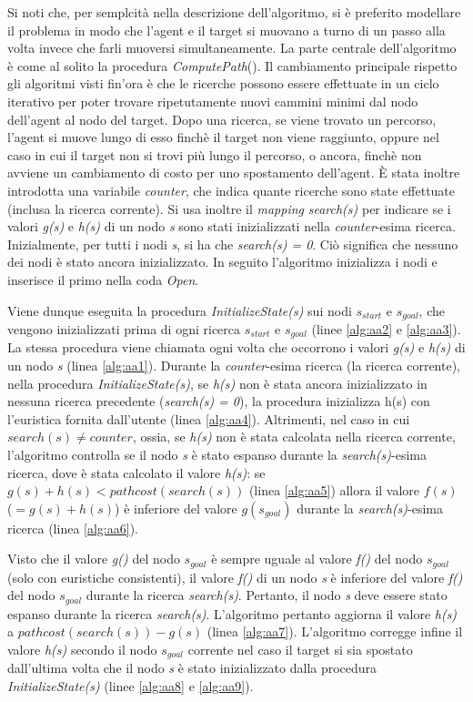 \documentclass[11pt]{book}
\begin{document}
\par{Si noti che, per semplcit\`a nella descrizione dell'algoritmo, si \`e preferito modellare il problema in modo che l'agent e il target si muovano a turno di un passo alla volta invece che farli muoversi simultaneamente. La parte centrale dell'algoritmo \`e come al solito la procedura \emph{ComputePath}(). Il cambiamento principale rispetto gli algoritmi visti fin'ora \`e che le ricerche possono essere effettuate in un ciclo iterativo per poter trovare ripetutamente nuovi cammini minimi dal nodo dell'agent al nodo del target. Dopo una ricerca, se viene trovato un percorso, l'agent si muove lungo di esso finch\`e il target non viene raggiunto, oppure nel caso in cui il target non si trovi pi\`u lungo il percorso, o ancora, finch\`e non avviene un cambiamento di costo per uno spostamento dell'agent. \`E stata inoltre introdotta una variabile \emph{counter}, che indica quante ricerche sono state effettuate (inclusa la ricerca corrente). Si usa inoltre il \emph{mapping} \emph{search(s)} per indicare se i valori \emph{g(s)} e \emph{h(s)} di un nodo \emph{s}  sono stati inizializzati nella \emph{counter}-esima ricerca. Inizialmente, per tutti i nodi \emph{s}, si ha che \emph{search(s) = 0}. Ci\`o significa che nessuno dei nodi \`e stato ancora inizializzato. In seguito l'algoritmo inizializza i nodi e inserisce il primo nella coda \emph{Open}.}
\par{Viene dunque eseguita la procedura \emph{InitializeState(s)} sui nodi $s_{start}$ e $s_{goal}$, che vengono inizializzati prima di ogni ricerca $s_{start}$ e $s_{goal}$ (linee \ref{alg:aa2} e \ref{alg:aa3}). La stessa procedura viene chiamata ogni volta che occorrono i valori \emph{g(s)} e \emph{h(s)} di un nodo \emph{s} (linea \ref{alg:aa1}). Durante la \emph{counter}-esima ricerca (la ricerca corrente), nella procedura \emph{InitializeState(s)}, se \emph{h(s)} non \`e stata ancora inizializzato in nessuna ricerca precedente (\emph{search(s) = 0}), la procedura inizializza h(s) con l'euristica fornita dall'utente (linea \ref{alg:aa4}). Altrimenti, nel caso in cui $search(s) \neq counter$, ossia, se \emph{h(s)} non \`e stata calcolata nella ricerca corrente, l'algoritmo controlla se il nodo \emph{s} \`e stato espanso durante la \emph{search(s)}-esima ricerca, dove \`e stata calcolato il valore \emph{h(s)}: se $g(s) + h(s) < pathcost(search(s))$ (linea \ref{alg:aa5}) allora il valore $f(s)$ ($= g(s) + h(s)$) \`e inferiore del valore $g(s_{goal})$ durante la \emph{search(s)}-esima ricerca (linea \ref{alg:aa6}).}
\par{Visto che il valore \emph{g()} del nodo $s_{goal}$ \`e sempre uguale al valore \emph{f()} del nodo $s_{goal}$ (solo con euristiche consistenti), il valore \emph{f()} di un nodo \emph{s} \`e inferiore del valore \emph{f()} del nodo $s_{goal}$ durante la ricerca \emph{search(s)}. Pertanto, il nodo \emph{s} deve essere stato espanso durante la ricerca \emph{search(s)}. L'algoritmo pertanto aggiorna il valore \emph{h(s)} a $pathcost(search(s)) - g(s)$ (linea \ref{alg:aa7}). L'algoritmo corregge infine il valore \emph{h(s)} secondo il nodo $s_{goal}$ corrente nel caso il target si sia spostato dall'ultima volta che il nodo \emph{s} \`e stato inizializzato dalla procedura \emph{InitializeState(s)} (linee \ref{alg:aa8} e \ref{alg:aa9}).}
\end{document}
